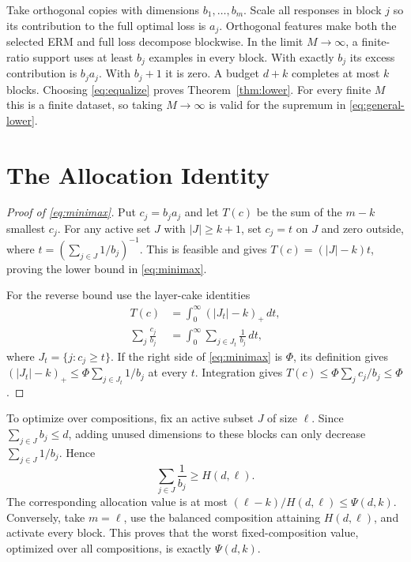 \documentclass[twoside]{article}
\begin{document}
Take orthogonal copies with dimensions $b_1,\ldots,b_m$. Scale all responses in block $j$ so its contribution to the full optimal loss is $a_j$. Orthogonal features make both the selected ERM and full loss decompose blockwise. In the limit $M\to\infty$, a finite-ratio support uses at least $b_j$ examples in every block. With exactly $b_j$ its excess contribution is $b_ja_j$. With $b_j+1$ it is zero. A budget $d+k$ completes at most $k$ blocks. Choosing \eqref{eq:equalize} proves Theorem~\ref{thm:lower}. For every finite $M$ this is a finite dataset, so taking $M\to\infty$ is valid for the supremum in \eqref{eq:general-lower}.

\section{The Allocation Identity}

\begin{proof}[Proof of \eqref{eq:minimax}]
Put $c_j=b_ja_j$ and let $T(c)$ be the sum of the $m-k$ smallest $c_j$. For any active set $J$ with $|J|\geq k+1$, set $c_j=t$ on $J$ and zero outside, where $t=(\sum_{j\in J}1/b_j)^{-1}$. This is feasible and gives $T(c)=(|J|-k)t$, proving the lower bound in \eqref{eq:minimax}.

For the reverse bound use the layer-cake identities
\begin{align}
 T(c)&=\int_0^\infty (|J_t|-k)_+\,dt,\\
 \sum_j\frac{c_j}{b_j}
 &=\int_0^\infty\sum_{j\in J_t}\frac1{b_j}\,dt,
 \end{align}
where $J_t=\{j:c_j\geq t\}$. If the right side of \eqref{eq:minimax} is $\Phi$, its definition gives $(|J_t|-k)_+\leq\Phi\sum_{j\in J_t}1/b_j$ at every $t$. Integration gives $T(c)\leq\Phi\sum_jc_j/b_j\leq\Phi$.
\end{proof}

To optimize over compositions, fix an active subset $J$ of size $\ell$. Since $\sum_{j\in J}b_j\leq d$, adding unused dimensions to these blocks can only decrease $\sum_{j\in J}1/b_j$. Hence
\begin{equation}
 \sum_{j\in J}\frac1{b_j}\geq H(d,\ell).
\end{equation}
The corresponding allocation value is at most $(\ell-k)/H(d,\ell)\leq\Psi(d,k)$. Conversely, take $m=\ell$, use the balanced composition attaining $H(d,\ell)$, and activate every block. This proves that the worst fixed-composition value, optimized over all compositions, is exactly $\Psi(d,k)$.
\end{document}

